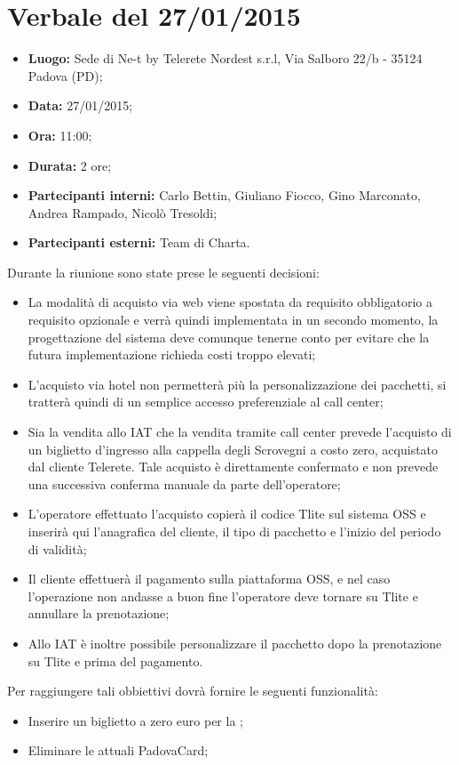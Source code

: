 \clearpage\null\newpage
\pagebreak
\section{Verbale del  27/01/2015}\label{verbale}
\begin{itemize}
\item \textbf{Luogo:} Sede di Ne-t by Telerete Nordest s.r.l, Via Salboro 22/b - 35124 Padova (PD);
\item \textbf{Data:} 27/01/2015;
\item \textbf{Ora:} 11:00;
\item \textbf{Durata:} 2 ore;
\item \textbf{Partecipanti interni:} Carlo Bettin, Giuliano Fiocco, Gino Marconato, Andrea Rampado, Nicolò Tresoldi;
\item \textbf{Partecipanti esterni:} Team di Charta.

\end{itemize}
Durante la riunione sono state prese le seguenti decisioni:
\begin{itemize}
\item La modalità di acquisto via web viene spostata da requisito obbligatorio a requisito opzionale e verrà quindi implementata in un secondo momento, la progettazione del sistema deve comunque tenerne conto per evitare che la futura implementazione richieda costi troppo elevati;
\item L'acquisto via hotel non permetterà più la personalizzazione dei pacchetti, si tratterà quindi di un semplice accesso preferenziale al call center;
\item Sia la vendita allo IAT che la vendita tramite call center prevede l'acquisto di un biglietto d'ingresso alla cappella degli Scrovegni a costo zero, acquistato dal cliente Telerete. Tale acquisto è direttamente confermato e non prevede una successiva conferma manuale da parte dell'operatore;
\item L'operatore effettuato l'acquisto copierà il codice Tlite sul sistema OSS e inserirà qui l'anagrafica del cliente, il tipo di pacchetto e l'inizio del periodo di validità;
\item Il cliente effettuerà il pagamento sulla piattaforma OSS, e nel caso l'operazione non andasse a buon fine l'operatore deve tornare su Tlite e annullare la prenotazione;
\item Allo IAT è inoltre possibile personalizzare il pacchetto dopo la prenotazione su Tlite e prima del pagamento.
\end{itemize}

Per raggiungere tali obbiettivi \charta dovrà fornire le seguenti funzionalità:
\begin{itemize}
\item Inserire un biglietto a zero euro per la \cappella;
\item Eliminare le attuali PadovaCard;
\end{itemize}


